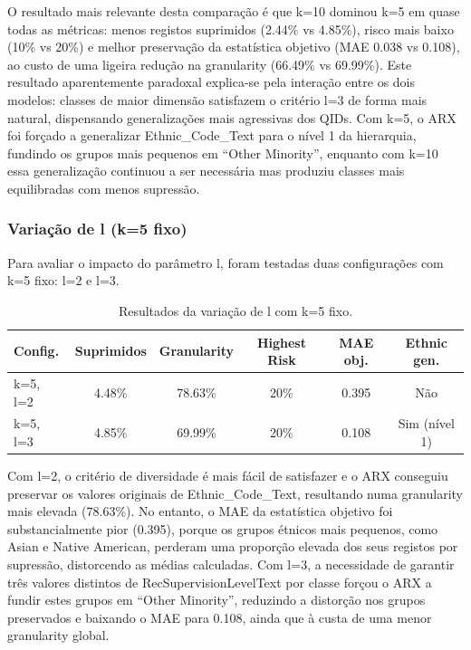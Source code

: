 O resultado mais relevante desta comparação é que k=10 dominou k=5 em quase todas as métricas: menos registos suprimidos (2.44\% vs 4.85\%), risco mais baixo (10\% vs 20\%) e melhor preservação da estatística objetivo (MAE 0.038 vs 0.108), ao custo de uma ligeira redução na granularity (66.49\% vs 69.99\%). Este resultado aparentemente paradoxal explica-se pela interação entre os dois modelos: classes de maior dimensão satisfazem o critério l=3 de forma mais natural, dispensando generalizações mais agressivas dos QIDs. Com k=5, o ARX foi forçado a generalizar Ethnic\_Code\_Text para o nível 1 da hierarquia, fundindo os grupos mais pequenos em ``Other Minority'', enquanto com k=10 essa generalização continuou a ser necessária mas produziu classes mais equilibradas com menos supressão.

\subsubsection{Variação de l (k=5 fixo)}

Para avaliar o impacto do parâmetro l, foram testadas duas configurações com k=5 fixo: l=2 e l=3.

\begin{table}[H]
\centering
\caption{Resultados da variação de l com k=5 fixo.}
\label{tab:variacao_l}
\begin{tabular}{lccccc}
\toprule
\textbf{Config.} & \textbf{Suprimidos} & \textbf{Granularity} & \textbf{Highest Risk} & \textbf{MAE obj.} & \textbf{Ethnic gen.} \\
\midrule
k=5, l=2 & 4.48\% & 78.63\% & 20\% & 0.395 & Não \\
k=5, l=3 & 4.85\% & 69.99\% & 20\% & 0.108 & Sim (nível 1) \\
\bottomrule
\end{tabular}
\end{table}

Com l=2, o critério de diversidade é mais fácil de satisfazer e o ARX conseguiu preservar os valores originais de Ethnic\_Code\_Text, resultando numa granularity mais elevada (78.63\%). No entanto, o MAE da estatística objetivo foi substancialmente pior (0.395), porque os grupos étnicos mais pequenos, como Asian e Native American, perderam uma proporção elevada dos seus registos por supressão, distorcendo as médias calculadas. Com l=3, a necessidade de garantir três valores distintos de RecSupervisionLevelText por classe forçou o ARX a fundir estes grupos em ``Other Minority'', reduzindo a distorção nos grupos preservados e baixando o MAE para 0.108, ainda que à custa de uma menor granularity global.


